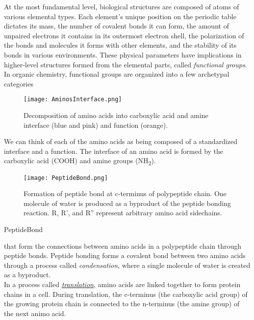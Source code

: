{At the most fundamental level, biological structures are composed of atoms of various elemental types.  Each element's unique position on the periodic table dictates its mass, the number of covalent bonds it can form, the amount of unpaired electrons it contains in its outermost electron shell, the polarization of the bonds and molecules it forms with other elements, and the stability of its bonds in various environments.  These physical parameters have implications in higher-level structures formed from the elemental parts, called \textit{functional groups}.\\



In organic chemistry, functional groups are organized into a few archetypal categories \\

\begin{figure}
  \texttt{[image: AminosInterface.png]}
  \caption{Decomposition of amino acids into carboxylic acid and amine interface (blue and pink) and function (orange).}
  \label{fig:AminosInterface}
\end{figure}

We can think of each of the amino acids as being composed of a standardized interface and a function.  The interface of an amino acid is formed by the carboxylic acid (COOH) and amine groups (NH\textsubscript{2}).  


\begin{figure}
  \texttt{[image: PeptideBond.png]}
  \caption{Formation of peptide bond at c-terminus of polypeptide chain. One molecule of water is produced as a byproduct of the peptide bonding reaction.  R, R', and R'' represent arbitrary amino acid sidechains.}
  \label{fig:PeptideBond}
\end{figure}
PeptideBond


 that form the connections between amino acids in a polypeptide chain through peptide bonds.  Peptide bonding forms a covalent bond between two amino acids through a process called \textit{condensation}, where a single molecule of water is created as a byproduct.\\

In a process called \href{https://en.wikipedia.org/wiki/Translation_%28biology%29}{\textit{translation}}, amino acids are linked together to form protein chains in a cell.  During translation, the c-terminus (the carboxylic acid group) of the growing protein chain is connected to the n-terminus (the amine group) of the next animo acid.

}
